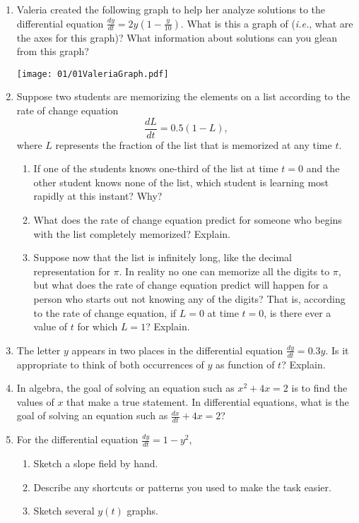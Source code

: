 \begin{enumerate}
\item Valeria created the following graph to help her analyze solutions to the differential equation $\displaystyle \frac{dy}{dt} = 2y \left(1-\frac{y}{10} \right)$. What is this a graph of ({\em i.e.}, what are the axes for this graph)? What information about solutions can you glean from this graph? \label{01HWproblem3}
\begin{center}
\texttt{[image: 01/01ValeriaGraph.pdf]}
\end{center}

\item  Suppose two students are memorizing the elements on a list according to the rate of change equation \[\frac{dL}{dt}=0.5(1-L),\] where $L$ represents the fraction of the list that is memorized at any time $t$.
\begin{enumerate}
\item	If one of the students knows one-third of the list at time $t = 0$ and the other student knows none of the list, which student is learning most rapidly at this instant? Why?
\item	What does the rate of change equation predict for someone who begins with the list completely memorized? Explain.
\item	Suppose now that the list is infinitely long, like the decimal representation for $\pi$. In reality no one can memorize all the digits to $\pi$, but what does the rate of change equation predict will happen for a person who starts out not knowing any of the digits? That is, according to the rate of change equation, if $L = 0$ at time $t = 0$, is there ever a value of $t$ for which $L = 1$? Explain. 

\end{enumerate}

\item The letter $y$ appears in two places in the differential equation $ \displaystyle \frac{dy}{dt} = 0.3y.$
Is it appropriate to think of both occurrences of $y$ as function of $t$? Explain.


\item In algebra, the goal of solving an equation such as $x^2 + 4x =2$ is to find the values of $x$ that make a true statement. In differential equations, what is the goal of solving an equation such as $\displaystyle\frac{dx}{dt}+4x=2$? 

\item  For the differential equation   $\displaystyle \frac{dy}{dt}=1-y^2$,
\begin{enumerate}
\item	Sketch a slope field by hand. 
\item	Describe any shortcuts or patterns you used to make the task easier.
\item	Sketch several $y(t)$ graphs.
\end{enumerate}


\end{enumerate}
